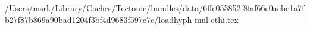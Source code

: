/Users/msrk/Library/Caches/Tectonic/bundles/data/6ffe055852f8faf66c0acbe1a7fb27f87b869a90bad1204f3bf4d9683f597c7c/loadhyph-mul-ethi.tex
